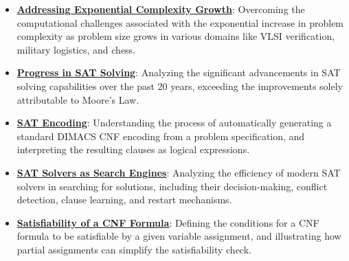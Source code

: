 \documentclass{article}%
\begin{document}
\begin{itemize}[leftmargin=*]
\item \href{https://purdue.brightspace.com/d2l/common/assets/pdfjs-d2l-dist/1.0.14-legacy/web/viewer.html?file=\%2Fcontent\%2Fenforced\%2F1095467-wl.202510.CS.24300.001\%2F15L2-SAT.pdf\%3Fou\%3D1095467\&lang=en-us\&container=d2l-fileviewer-rendered-pdf\&fullscreen=d2l-fileviewer-rendered-pdf-dialog\&height=667#page=4}{\textbf{Addressing Exponential Complexity Growth}}: Overcoming the computational challenges associated with the exponential increase in problem complexity as problem size grows in various domains like VLSI verification, military logistics, and chess.%
\item \href{https://purdue.brightspace.com/d2l/common/assets/pdfjs-d2l-dist/1.0.14-legacy/web/viewer.html?file=\%2Fcontent\%2Fenforced\%2F1095467-wl.202510.CS.24300.001\%2F15L2-SAT.pdf\%3Fou\%3D1095467\&lang=en-us\&container=d2l-fileviewer-rendered-pdf\&fullscreen=d2l-fileviewer-rendered-pdf-dialog\&height=667#page=5}{\textbf{Progress in SAT Solving}}: Analyzing the significant advancements in SAT solving capabilities over the past 20 years, exceeding the improvements solely attributable to Moore's Law.%
\item \href{https://purdue.brightspace.com/d2l/common/assets/pdfjs-d2l-dist/1.0.14-legacy/web/viewer.html?file=\%2Fcontent\%2Fenforced\%2F1095467-wl.202510.CS.24300.001\%2F15L2-SAT.pdf\%3Fou\%3D1095467\&lang=en-us\&container=d2l-fileviewer-rendered-pdf\&fullscreen=d2l-fileviewer-rendered-pdf-dialog\&height=667#page=7}{\textbf{SAT Encoding}}: Understanding the process of automatically generating a standard DIMACS CNF encoding from a problem specification, and interpreting the resulting clauses as logical expressions.%
\item \href{https://purdue.brightspace.com/d2l/common/assets/pdfjs-d2l-dist/1.0.14-legacy/web/viewer.html?file=\%2Fcontent\%2Fenforced\%2F1095467-wl.202510.CS.24300.001\%2F15L2-SAT.pdf\%3Fou\%3D1095467\&lang=en-us\&container=d2l-fileviewer-rendered-pdf\&fullscreen=d2l-fileviewer-rendered-pdf-dialog\&height=667#page=11}{\textbf{SAT Solvers as Search Engines}}: Analyzing the efficiency of modern SAT solvers in searching for solutions, including their decision-making, conflict detection, clause learning, and restart mechanisms.%
\item \href{https://purdue.brightspace.com/d2l/common/assets/pdfjs-d2l-dist/1.0.14-legacy/web/viewer.html?file=\%2Fcontent\%2Fenforced\%2F1095467-wl.202510.CS.24300.001\%2F15L2-SAT.pdf\%3Fou\%3D1095467\&lang=en-us\&container=d2l-fileviewer-rendered-pdf\&fullscreen=d2l-fileviewer-rendered-pdf-dialog\&height=667#page=13}{\textbf{Satisfiability of a CNF Formula}}: Defining the conditions for a CNF formula to be satisfiable by a given variable assignment, and illustrating how partial assignments can simplify the satisfiability check.%

\end{itemize}
\end{document}

